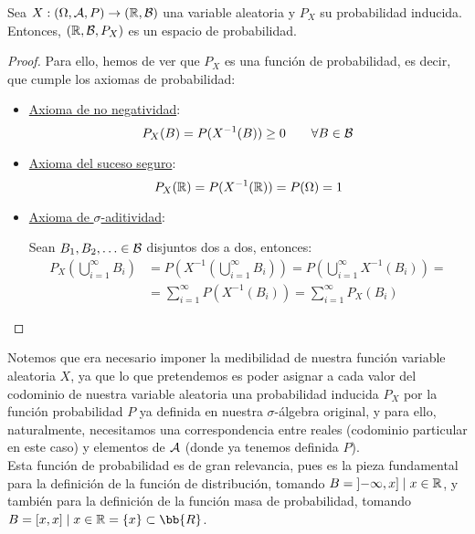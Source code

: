 \begin{prop}
    Sea $X:(\Omega, \mathcal{A}, P) \rightarrow (\mathbb R, \mathcal{B})$ una variable aleatoria y $P_X$ su probabilidad inducida.
    Entonces, $(\mathbb R, \mathcal{B}, P_X)$ es un espacio de probabilidad.
\end{prop}
\begin{proof} Para ello, hemos de ver que $P_X$ es una función de probabilidad, es decir, que cumple los axiomas de probabilidad:
    \begin{itemize}
        \item \ul{Axioma de no negatividad}:
              $$P_X(B) = P(X^{-1}(B)) \geq 0 \qquad \forall B \in \mathcal{B}$$
        \item \ul{Axioma del suceso seguro}:
              $$P_X(\mathbb R) = P(X^{-1}(\mathbb R)) = P(\Omega) = 1$$
        \item \ul{Axioma de $\sigma$-aditividad}:
        
        Sean $B_1, B_2, \ldots \in \mathcal{B}$ disjuntos dos a dos, entonces:
        \begin{align*}
            P_X\left(\bigcup\limits_{i=1}^{\infty} B_i\right) &= P\left(X^{-1}\left(\bigcup_{i=1}^{\infty} B_i\right)\right) = P\left(\bigcup_{i=1}^{\infty} X^{-1}(B_i)\right) =\\&= \sum_{i=1}^{\infty} P(X^{-1}(B_i)) = \sum_{i=1}^{\infty} P_X(B_i)
        \end{align*}
    \end{itemize}
\end{proof}

Notemos que era necesario imponer la medibilidad de nuestra función variable aleatoria $X$, ya que lo que pretendemos es poder asignar a cada valor del codominio de nuestra variable aleatoria una probabilidad inducida $P_X$ por la función probabilidad $P$ ya definida en nuestra $\sigma$-álgebra original, y para ello, naturalmente, necesitamos una correspondencia entre reales (codominio particular en este caso) y elementos de $\mathcal{A}$ (donde ya tenemos definida $P$).\\

Esta función de probabilidad es de gran relevancia, pues es la pieza fundamental para la definición de la función de distribución, tomando $B=\left]-\infty, x\right] \mid x \in \mathbb R$, y también para la definición de la función masa de probabilidad, tomando $B=[x,x] \mid x \in \R = \{x\}\subset \bb{R}$.\\

